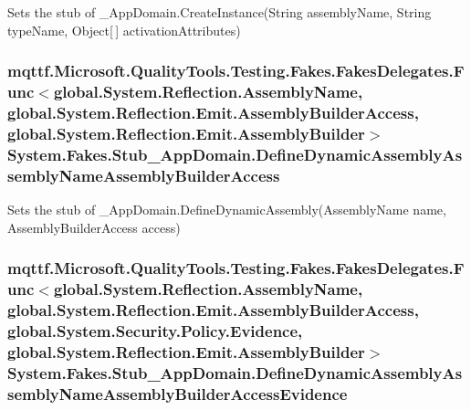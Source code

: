 Sets the stub of \-\_\-\-App\-Domain.\-Create\-Instance(\-String assembly\-Name, String type\-Name, Object\mbox{[}$\,$\mbox{]} activation\-Attributes)

\hypertarget{class_system_1_1_fakes_1_1_stub___app_domain_a37d13d6ab34b03df75b686feb6e0ae40}{
\subsubsection[{Define\-Dynamic\-Assembly\-Assembly\-Name\-Assembly\-Builder\-Access}]{\setlength{\rightskip}{0pt plus 5cm}mqttf.\-Microsoft.\-Quality\-Tools.\-Testing.\-Fakes.\-Fakes\-Delegates.\-Func$<$global.\-System.\-Reflection.\-Assembly\-Name, global.\-System.\-Reflection.\-Emit.\-Assembly\-Builder\-Access, global.\-System.\-Reflection.\-Emit.\-Assembly\-Builder$>$ System.\-Fakes.\-Stub\-\_\-\-App\-Domain.\-Define\-Dynamic\-Assembly\-Assembly\-Name\-Assembly\-Builder\-Access}}\label{class_system_1_1_fakes_1_1_stub___app_domain_a37d13d6ab34b03df75b686feb6e0ae40}


Sets the stub of \-\_\-\-App\-Domain.\-Define\-Dynamic\-Assembly(\-Assembly\-Name name, Assembly\-Builder\-Access access)

\hypertarget{class_system_1_1_fakes_1_1_stub___app_domain_a71f929aa55e9aaa5d3797aed83972076}{
\subsubsection[{Define\-Dynamic\-Assembly\-Assembly\-Name\-Assembly\-Builder\-Access\-Evidence}]{\setlength{\rightskip}{0pt plus 5cm}mqttf.\-Microsoft.\-Quality\-Tools.\-Testing.\-Fakes.\-Fakes\-Delegates.\-Func$<$global.\-System.\-Reflection.\-Assembly\-Name, global.\-System.\-Reflection.\-Emit.\-Assembly\-Builder\-Access, global.\-System.\-Security.\-Policy.\-Evidence, global.\-System.\-Reflection.\-Emit.\-Assembly\-Builder$>$ System.\-Fakes.\-Stub\-\_\-\-App\-Domain.\-Define\-Dynamic\-Assembly\-Assembly\-Name\-Assembly\-Builder\-Access\-Evidence}}\label{class_system_1_1_fakes_1_1_stub___app_domain_a71f929aa55e9aaa5d3797aed83972076}


